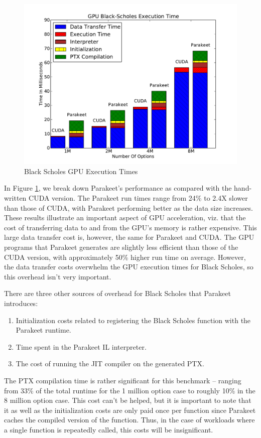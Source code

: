 \documentclass[preprint]{sigplanconf}
\begin{document}
\begin{figure}[h!]
\includegraphics[scale=0.45]{BSNOCPU.pdf}
\caption{Black Scholes GPU Execution Times}
\label{BSGPU}
\end{figure}

In Figure \ref{BSGPU}, we break down Parakeet's performance as compared with the hand-written CUDA version.  The Parakeet run times range from 24\% to 2.4X slower than those of CUDA, with Parakeet performing better as the data size increases.  These results illustrate an important aspect of GPU acceleration, viz. that the cost of transferring data to and from the GPU's memory is rather expensive.  This large data transfer cost is, however, the same for Parakeet and CUDA.  The GPU programs that Parakeet generates are slightly less efficient than those of the CUDA version, with approximately 50\% higher run time on average.  However, the data transfer costs overwhelm the GPU execution times for Black Scholes, so this overhead isn't very important. 

 There are three other sources of overhead for Black Scholes that Parakeet introduces:
\begin{enumerate}
\item Initialization costs related to registering the Black Scholes function with the Parakeet runtime.
\item Time spent in the Parakeet IL interpreter.
\item The cost of running the JIT compiler on the generated PTX.
\end{enumerate}

The PTX compilation time is rather significant for this benchmark -- ranging from 33\% of the total runtime for the 1 million option case to roughly 10\% in the 8 million option case.  This cost can't be helped, but it is important to note that it as well as the initialization costs are only paid once per function since Parakeet caches the compiled version of the function.  Thus, in the case of workloads where a single function is repeatedly called, this costs will be insignificant.
\end{document}
